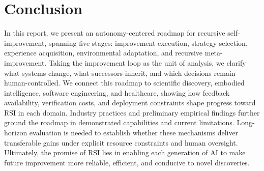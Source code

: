 \section{Conclusion}

In this report, we present an autonomy-centered roadmap for recursive self-improvement, spanning five stages: improvement execution, strategy selection, experience acquisition, environmental adaptation, and recursive meta-improvement. Taking the improvement loop as the unit of analysis, we clarify what systems change, what successors inherit, and which decisions remain human-controlled. We connect this roadmap to scientific discovery, embodied intelligence, software engineering, and healthcare, showing how feedback availability, verification costs, and deployment constraints shape progress toward RSI in each domain. Industry practices and preliminary empirical findings further ground the roadmap in demonstrated capabilities and current limitations. Long-horizon evaluation is needed to establish whether these mechanisms deliver transferable gains under explicit resource constraints and human oversight. Ultimately, the promise of RSI lies in enabling each generation of AI to make future improvement more reliable, efficient, and conducive to novel discoveries.






